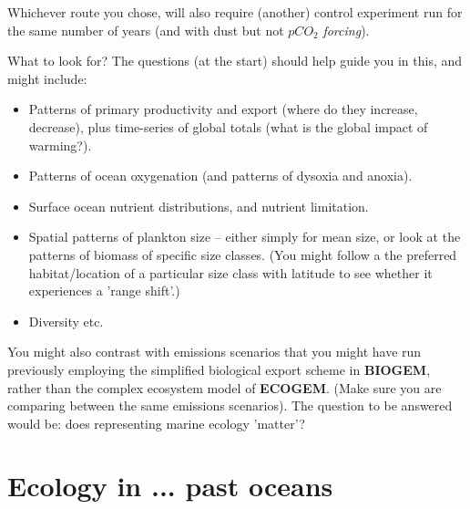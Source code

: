 \documentclass[11pt,fleqn]{book} %
\begin{document}
\begin{enumerate}[noitemsep]
\begin{itemize}[noitemsep]
\end{itemize}

\vspace{1mm}
\noindent Whichever route you chose, will also require (another) control experiment run for the same number of years (and with dust but not \(pCO_{2}\) \textit{forcing}).

\end{enumerate}

\vspace{1mm}
\noindent What to look for? The questions (at the start) should help guide you in this, and might include:

\vspace{1mm}
\begin{itemize}[noitemsep]
\item Patterns of primary productivity and export (where do they increase, decrease), plus time-series of global totals (what is the global impact of warming?).
\item Patterns of ocean oxygenation (and patterns of dysoxia and anoxia).
\item Surface ocean nutrient distributions, and nutrient limitation.
\item Spatial patterns of plankton size -- either simply for mean size, or look at the patterns of biomass of specific size classes. (You might follow a the preferred habitat/location of a particular size class with latitude to see whether it experiences a 'range shift'.)
\item Diversity etc.
\end{itemize}

\vspace{1mm}
\noindent You might also contrast with emissions scenarios that you might have run previously employing the simplified biological export scheme in \textbf{BIOGEM}, rather than the complex ecosystem model of \textbf{ECOGEM}. (Make sure you are comparing between the same emissions scenarios). The question to be answered would be: does representing marine ecology 'matter'?


\newpage


\section{Ecology in ... past oceans}
\end{document}
